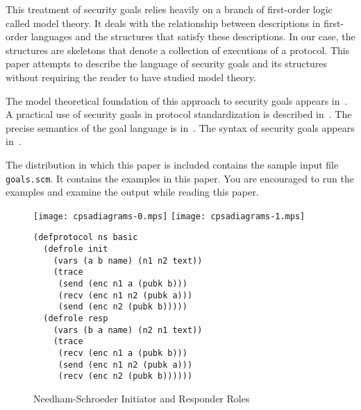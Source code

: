 \documentclass[12pt]{article}
\begin{document}
This treatment of security goals relies heavily on a branch of
first-order logic called model theory.  It deals with the relationship
between descriptions in first-order languages and the structures that
satisfy these descriptions.  In our case, the structures are skeletons
that denote a collection of executions of a protocol.  This paper
attempts to describe the language of security goals and its
structures without requiring the reader to have studied model theory.

The model theoretical foundation of this approach to security goals
appears in~\cite{Guttman14}.  A practical use of security goals in
protocol standardization is described in~\cite{GuttmanLiskovRowe14}.
The precise semantics of the goal language is
in~\cite[Appendix~C]{cpsaspec09}.  The syntax of security goals
appears in~\cite[Table~2]{cpsaprimer09}.

The distribution in which this paper is included contains the sample
input {\cpsa} file \texttt{goals.scm}.  It contains the examples in
this paper.  You are encouraged to run the examples and examine the
output while reading this paper.


\begin{figure}
\begin{center}
\texttt{[image: cpsadiagrams-0.mps]}\hfil
\texttt{[image: cpsadiagrams-1.mps]}\\
\end{center}
\begin{center}
\begin{minipage}{3in}
\begin{verbatim}
(defprotocol ns basic
  (defrole init
    (vars (a b name) (n1 n2 text))
    (trace
     (send (enc n1 a (pubk b)))
     (recv (enc n1 n2 (pubk a)))
     (send (enc n2 (pubk b)))))
  (defrole resp
    (vars (b a name) (n2 n1 text))
    (trace
     (recv (enc n1 a (pubk b)))
     (send (enc n1 n2 (pubk a)))
     (recv (enc n2 (pubk b))))))
\end{verbatim}
\end{minipage}
\end{center}
\caption{Needham-Schroeder Initiator and Responder Roles}
\label{fig:ns roles}
\end{figure}
\end{document}
